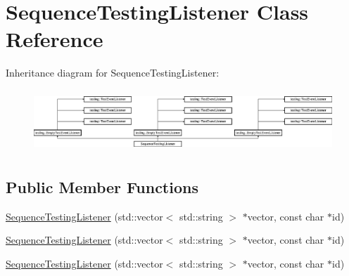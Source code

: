 \hypertarget{class_sequence_testing_listener}{}\section{Sequence\+Testing\+Listener Class Reference}
\label{class_sequence_testing_listener}
Inheritance diagram for Sequence\+Testing\+Listener\+:\begin{figure}[H]
\begin{center}
\leavevmode
\includegraphics[height=2.380952cm]{d8/d17/class_sequence_testing_listener}
\end{center}
\end{figure}
\subsection*{Public Member Functions}
\begin{DoxyCompactItemize}
\item 
\mbox{\hyperlink{class_sequence_testing_listener_ac0fcb350d20876f8273621ad4c79ba7a}{Sequence\+Testing\+Listener}} (std\+::vector$<$ std\+::string $>$ $\ast$vector, const char $\ast$id)
\item 
\mbox{\hyperlink{class_sequence_testing_listener_ac0fcb350d20876f8273621ad4c79ba7a}{Sequence\+Testing\+Listener}} (std\+::vector$<$ std\+::string $>$ $\ast$vector, const char $\ast$id)
\item 
\mbox{\hyperlink{class_sequence_testing_listener_ac0fcb350d20876f8273621ad4c79ba7a}{Sequence\+Testing\+Listener}} (std\+::vector$<$ std\+::string $>$ $\ast$vector, const char $\ast$id)
\end{DoxyCompactItemize}
